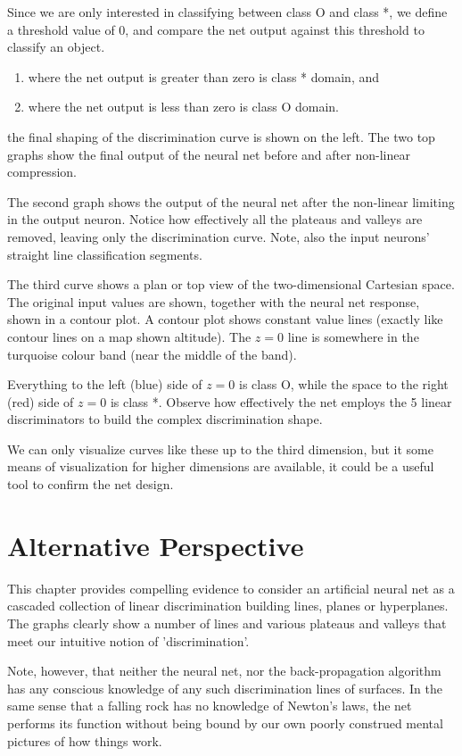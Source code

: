 Since we are only interested in classifying between class O and class *, we define a threshold value of $0$, and compare the net output against this threshold to classify an object. 
\begin{enumerate}
\item where the net output is greater than zero is class * domain, and 
\item where the net output is less than zero is class O domain.  
\end{enumerate} 
the final shaping of the discrimination curve is shown on the left.  The two top graphs show the final output of the neural net before and after non-linear compression.  

The second graph shows the output of the neural net after the non-linear limiting in the output neuron.  Notice how effectively all the plateaus and valleys are removed, leaving only the discrimination curve.  Note, also the input neurons' straight line classification segments.

The third curve shows a plan or top view of the two-dimensional Cartesian space.   The original input values are shown, together with the neural net response, shown in a contour plot.  A contour plot shows constant value lines (exactly like contour lines on a map shown altitude).  The $z=0$  line is somewhere in the turquoise colour band (near the middle of the band).  

Everything to the left (blue) side of $z=0$  is class O,  while the space to the right (red) side of $z=0$  is class *.  Observe how effectively the net employs the 5 linear discriminators to build the complex discrimination shape.  

We can only visualize curves like these up to the third dimension, but it some means of visualization for higher dimensions are available, it could be a useful tool to confirm the net design.

\section{Alternative Perspective}

This chapter provides compelling evidence to consider an artificial  neural net as a cascaded collection of linear discrimination building lines, planes or hyperplanes.  The graphs clearly show a number of lines and various plateaus and valleys that meet our intuitive notion of 'discrimination'.

Note, however, that neither the neural net, nor the back-propagation algorithm has any conscious knowledge of any such discrimination lines of surfaces.  In the same sense that a falling rock has no knowledge of Newton's laws, the net performs its function without being bound by our own poorly construed mental pictures of how things work.

